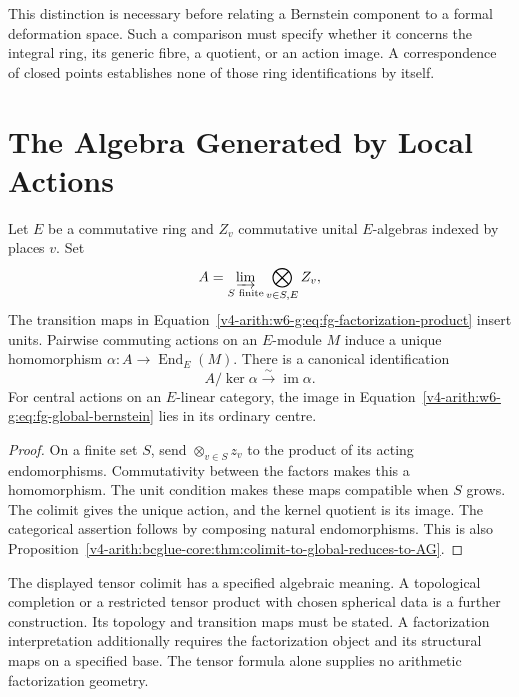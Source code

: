 This distinction is necessary before relating a Bernstein component
to a formal deformation space. Such a comparison must specify
whether it concerns the integral ring, its generic fibre, a quotient,
or an action image. A correspondence of closed points establishes
none of those ring identifications by itself.

\section{The Algebra Generated by Local Actions}

\begin{proposition}
\label{v4-arith:w6-g:thm:fg-factorization-gluing}
Let $E$ be a commutative ring and $Z_v$ commutative unital
$E$-algebras indexed by places $v$. Set
\begin{equation}
\label{v4-arith:w6-g:eq:fg-factorization-product}
 A=\varinjlim_{S\text{ finite}}\bigotimes_{v\in S,E}Z_v,
\end{equation}
The transition maps in
Equation~\eqref{v4-arith:w6-g:eq:fg-factorization-product} insert units.
Pairwise commuting actions on an $E$-module $M$ induce a unique
homomorphism $\alpha:A\to\operatorname{End}_E(M)$.
There is a canonical identification
\begin{equation}
\label{v4-arith:w6-g:eq:fg-global-bernstein}
 A/\ker\alpha\xrightarrow{\sim}\operatorname{im}\alpha.
\end{equation}
For central actions on an $E$-linear category, the image in
Equation~\eqref{v4-arith:w6-g:eq:fg-global-bernstein} lies in
its ordinary centre.
\end{proposition}

\begin{proof}
On a finite set $S$, send $\otimes_{v\in S}z_v$ to the product
of its acting endomorphisms. Commutativity between the factors
makes this a homomorphism. The unit condition makes these maps
compatible when $S$ grows. The colimit gives the unique action,
and the kernel quotient is its image. The categorical assertion
follows by composing natural endomorphisms.
This is also
Proposition~\ref{v4-arith:bcglue-core:thm:colimit-to-global-reduces-to-AG}.
\end{proof}

The displayed tensor colimit has a specified algebraic meaning.
A topological completion or a restricted tensor product with chosen
spherical data is a further construction. Its topology and transition
maps must be stated. A factorization interpretation additionally
requires the factorization object and its structural maps on a
specified base. The tensor formula alone supplies no arithmetic
factorization geometry.

